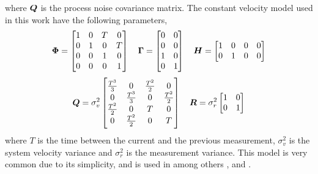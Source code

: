 where $\bm{Q}$ is the process noise covariance matrix. The constant velocity model used in this work have the following parameters,
\begin{equation*}
\bm{\Phi} =	\begin{bmatrix}
1 & 0 & T & 0 \\
0 & 1 & 0 & T \\
0 & 0 & 1 & 0 \\
0 & 0 & 0 & 1 \\
\end{bmatrix} \quad
\bm{\Gamma} = \begin{bmatrix}
0 & 0 \\
0 & 0 \\
1 & 0 \\
0 & 1 \\
\end{bmatrix} \quad
\bm{H} = \begin{bmatrix}
1 & 0 & 0 & 0 \\
0 & 1 & 0 & 0 \\
\end{bmatrix}
\end{equation*}
\begin{equation*}
\bm{Q}	= \sigma_v^2 \begin{bmatrix}
\frac{T^3}{3} 	& 0 				& \frac{T^2}{2}	& 0 			\\
0 				& \frac{T^3}{3}  	& 0 			& \frac{T^2}{2}	\\
\frac{T^2}{2}	& 0					& T				& 0				\\
0				& \frac{T^2}{2}		& 0				& T				\\
\end{bmatrix} \quad
\bm{R} = \sigma_r^2 \begin{bmatrix}
1 & 0 \\
0 & 1 \\
\end{bmatrix}
\end{equation*}
where $T$ is the time between the current and the previous measurement, $\sigma_v^2$ is the system velocity variance and $\sigma_r^2$ is the measurement variance. This model is very common due to its simplicity, and is used in among others \cite{Reid1979}, \cite{Coraluppi2000} and \cite{Brekke2012}.

